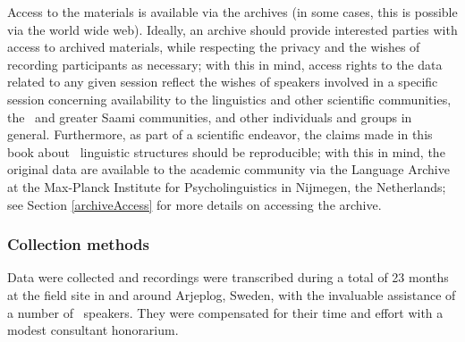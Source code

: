 Access to the materials is available via the archives (in some cases, this is possible via the world wide web). %
Ideally, an archive should provide interested parties with access to archived materials, while respecting the privacy and the wishes of recording participants as necessary; with this in mind, access rights to the data related to any given session reflect the wishes of speakers involved in a specific session concerning availability to the linguistics and other scientific communities, the \PS\ and greater Saami communities, and other individuals and groups in general. %
Furthermore, as part of a scientific endeavor, the claims made in this book about \PS\ linguistic structures should be reproducible; with this in mind, the original data are available to the academic community via the Language Archive at the Max-Planck Institute for Psycholinguistics in Nijmegen, the Netherlands; see Section \ref{archiveAccess} for more details on accessing the archive. 


\subsubsection{Collection methods}\label{collectionMethods}
Data were collected and recordings were transcribed during a total of 23 months at the field site in and around Arjeplog, Sweden, %
with the invaluable assistance of a number of \PS\ speakers. They were compensated for their time and effort with a modest consultant honorarium. 

